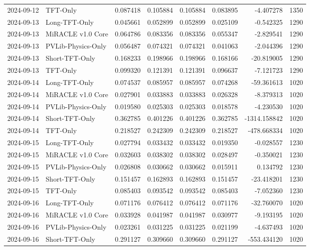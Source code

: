 \begin{tabular}{llrrrrrr}
2024-09-12 & TFT-Only & 0.087418 & 0.105884 & 0.105884 & 0.083895 & -4.407278 & 1350 \\
2024-09-13 & Long-TFT-Only & 0.045661 & 0.052899 & 0.052899 & 0.025109 & -0.542325 & 1290 \\
2024-09-13 & MiRACLE v1.0 Core & 0.064786 & 0.083356 & 0.083356 & 0.055347 & -2.829541 & 1290 \\
2024-09-13 & PVLib-Physics-Only & 0.056487 & 0.074321 & 0.074321 & 0.041063 & -2.044396 & 1290 \\
2024-09-13 & Short-TFT-Only & 0.168233 & 0.198966 & 0.198966 & 0.168166 & -20.819005 & 1290 \\
2024-09-13 & TFT-Only & 0.099320 & 0.121391 & 0.121391 & 0.096637 & -7.121723 & 1290 \\
2024-09-14 & Long-TFT-Only & 0.074537 & 0.085957 & 0.085957 & 0.074268 & -59.361613 & 1020 \\
2024-09-14 & MiRACLE v1.0 Core & 0.027901 & 0.033883 & 0.033883 & 0.026328 & -8.379313 & 1020 \\
2024-09-14 & PVLib-Physics-Only & 0.019580 & 0.025303 & 0.025303 & 0.018578 & -4.230530 & 1020 \\
2024-09-14 & Short-TFT-Only & 0.362785 & 0.401226 & 0.401226 & 0.362785 & -1314.158842 & 1020 \\
2024-09-14 & TFT-Only & 0.218527 & 0.242309 & 0.242309 & 0.218527 & -478.668334 & 1020 \\
2024-09-15 & Long-TFT-Only & 0.027794 & 0.033432 & 0.033432 & 0.019350 & -0.028557 & 1230 \\
2024-09-15 & MiRACLE v1.0 Core & 0.032603 & 0.038302 & 0.038302 & 0.028497 & -0.350021 & 1230 \\
2024-09-15 & PVLib-Physics-Only & 0.026808 & 0.030662 & 0.030662 & 0.015911 & 0.134792 & 1230 \\
2024-09-15 & Short-TFT-Only & 0.151457 & 0.162893 & 0.162893 & 0.151457 & -23.418201 & 1230 \\
2024-09-15 & TFT-Only & 0.085403 & 0.093542 & 0.093542 & 0.085403 & -7.052360 & 1230 \\
2024-09-16 & Long-TFT-Only & 0.071176 & 0.076412 & 0.076412 & 0.071176 & -32.760070 & 1020 \\
2024-09-16 & MiRACLE v1.0 Core & 0.033928 & 0.041987 & 0.041987 & 0.030977 & -9.193195 & 1020 \\
2024-09-16 & PVLib-Physics-Only & 0.023261 & 0.031225 & 0.031225 & 0.021199 & -4.637493 & 1020 \\
2024-09-16 & Short-TFT-Only & 0.291127 & 0.309660 & 0.309660 & 0.291127 & -553.434120 & 1020 \\

\end{tabular}
